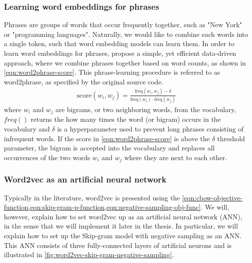 \subsubsection{Learning word embeddings for phrases}
\label{sec:learning-word-embeddings-for-phrases}
Phrases are groups of words that occur frequently together, such as "New York" or "programming languages". Naturally, we would like to combine such words into a single token, such that word embedding models can learn them. In order to learn word embeddings for phrases, \cite[4 Learning Phrases]{mikolov2013b} propose a simple, yet efficient data-driven approach, where we combine phrases together based on word counts, as shown in \cref{eqn:word2phrase-score}. This phrase-learning procedure is referred to as word2phrase, as specified by the original source code.
\begin{align}
    \text{score}(w_i, w_j) = \frac{\text{freq}(w_i, w_j) - \delta}{\text{freq}(w_i) \cdot \text{freq}(w_j)}
    \label{eqn:word2phrase-score}
\end{align}
where $w_i$ and $w_j$ are bigrams, or two neighboring words, from the vocabulary, $freq()$ returns the how many times the word (or bigram) occurs in the vocabulary and $\delta$ is a hyperparameter used to prevent long phrases consisting of infrequent words. If the score in \cref{eqn:word2phrase-score} is above the $\delta$ threshold parameter, the bigram is accepted into the vocabulary and replaces all occurrences of the two words $w_i$ and $w_j$ where they are next to each other.

\subsubsection{Word2vec as an artificial neural network}
\label{sec:word2vec-as-an-ann}
Typically in the literature, word2vec is presented using the \cref{eqn:cbow-objective-function,eqn:skip-gram-p-function,eqn:negative-sampling-obj-func}. We will, however, explain how to set word2vec up as an artificial neural network (ANN), in the sense that we will implement it later in the thesis. In particular, we will explain how to set up the Skip-gram model with negative sampling as an ANN. This ANN consists of three fully-connected layers of artificial neurons \cite{rong2016word2vec} and is illustrated in \cref{fig:word2vec-skip-gram-negative-sampling}.

